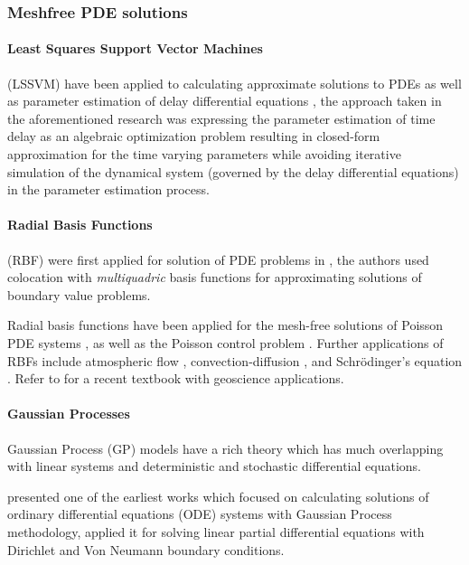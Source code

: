 \subsubsection*{Meshfree PDE solutions}

\paragraph{Least Squares Support Vector Machines}

(LSSVM) have been applied to calculating approximate solutions to PDEs
\citep{MEHRKANOON2015105,MEHRKANOON20122502} as well as
parameter estimation of delay differential equations
\citep{MEHRKANOON2014830}, the approach taken in the aforementioned
research \citep{MEHRKANOON2014830} was expressing the parameter
estimation of time delay as an algebraic optimization problem
resulting in closed-form approximation for the time varying parameters
while avoiding iterative simulation of the dynamical system (governed
by the delay differential equations) in the parameter estimation process.

\paragraph{Radial Basis Functions}

(RBF) were first applied for solution of PDE problems in \citet{KANSA1990147}, 
the authors used colocation with \emph{multiquadric} basis functions for approximating solutions
of boundary value problems.

Radial basis functions have been applied for the mesh-free solutions of Poisson PDE systems 
\citep{AMINATAEI20082887,DUAN200866,DUAN2006394,CNM:CNM419}, as well as the Poisson control problem 
\citep{Pearson2013}. Further applications of RBFs include atmospheric flow \citep{Tillenius2015406}, 
convection-diffusion \citep{Safdari-Vaighani2015}, and Schrödinger's equation \citep{doi:10.1137/120893975}. 
Refer to \citet{fornberg2015} for a recent textbook with geoscience applications.

\paragraph{Gaussian Processes}

Gaussian Process (GP) models \citep{Rasmussen:2005:GPM:1162254} have a rich theory which has much overlapping 
with linear systems and deterministic and stochastic differential equations. 

\citet{Skilling1992} presented one of the earliest works which focused on calculating solutions of ordinary 
differential equations (ODE) systems with Gaussian Process methodology, \citet{Graepel} applied it for solving 
linear partial differential equations with Dirichlet and Von Neumann boundary conditions.


